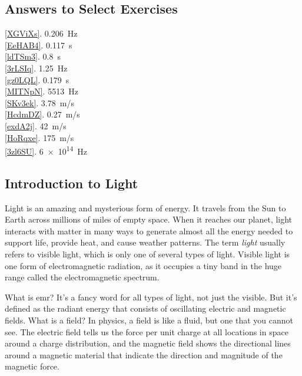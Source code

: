 \documentclass{article}
\numberwithin{equation}{section}
\numberwithin{figure}{section}
\begin{document}
\clearpage
\printnoidxglossaries




\clearpage

\subsection*{Answers to Select Exercises}


\ref{XGViXs}. \SI{0.206}{Hz}\\
\ref{EeHAB4}. \SI{0.117}{s}\\
\ref{ldTSm3}. \SI{0.8}{s}\\
\ref{3rLSIq}. \SI{1.25}{Hz}\\
\ref{gz0LQL}. \SI{0.179}{s}\\
\ref{MITNpN}. \SI{5513}{Hz}\\
\ref{SKv3ek}. \SI{3.78}{m/s}\\
\ref{HcdmDZ}. \SI{0.27}{m/s}\\
\ref{exdA2j}. \SI{42}{m/s}\\
\ref{HoRqxe}. \SI{175}{m/s}\\
\ref{3zl6SU}. \SI{6e14}{Hz}\\

\clearpage

\subsection{Introduction to Light} \label{SJFjXy}

Light is an amazing and mysterious form of energy. It travels from the Sun to Earth across millions of miles of empty space. When it reaches our planet, light interacts with matter in many ways to generate almost all the energy needed to support life, provide heat, and cause weather patterns. The term \textit{light} usually refers to visible light, which is only one of several types of light. Visible light is one form of electromagnetic radiation, as it occupies a tiny band in the huge range called the electromagnetic spectrum.

\vspace{1em}


What is \gls{emr}? It's a fancy word for all types of light, not just the visible. But it's defined as the radiant energy that consists of oscillating electric and magnetic fields. What is a field? In physics, a field is like a fluid, but one that you cannot see. The \gls{electric field} tells us the force per unit charge at all locations in space around a charge distribution, and the \gls{magnetic field} shows the directional lines around a magnetic material that indicate the direction and magnitude of the magnetic force. 
\end{document}
